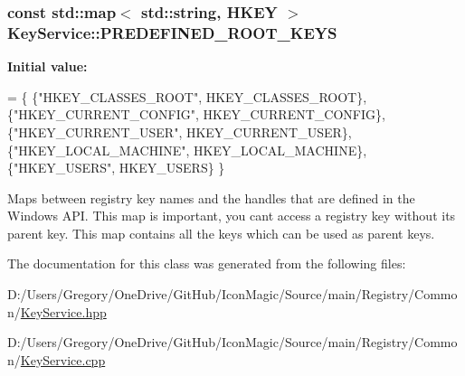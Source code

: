 \subsubsection[{P\+R\+E\+D\+E\+F\+I\+N\+E\+D\+\_\+\+R\+O\+O\+T\+\_\+\+K\+E\+Y\+S}]{\setlength{\rightskip}{0pt plus 5cm}const std\+::map$<$ std\+::string, H\+K\+E\+Y $>$ Key\+Service\+::\+P\+R\+E\+D\+E\+F\+I\+N\+E\+D\+\_\+\+R\+O\+O\+T\+\_\+\+K\+E\+Y\+S\hspace{0.3cm}{\ttfamily [static]}}\label{class_key_service_a105020a568634a91740816aff99ad318}
{\bfseries Initial value\+:}
\begin{DoxyCode}
= \{
  \{\textcolor{stringliteral}{"HKEY\_CLASSES\_ROOT"}, HKEY\_CLASSES\_ROOT\},
  \{\textcolor{stringliteral}{"HKEY\_CURRENT\_CONFIG"}, HKEY\_CURRENT\_CONFIG\},
  \{\textcolor{stringliteral}{"HKEY\_CURRENT\_USER"}, HKEY\_CURRENT\_USER\},
  \{\textcolor{stringliteral}{"HKEY\_LOCAL\_MACHINE"}, HKEY\_LOCAL\_MACHINE\},
  \{\textcolor{stringliteral}{"HKEY\_USERS"}, HKEY\_USERS\}
\}
\end{DoxyCode}
Maps between registry key names and the handles that are defined in the Windows A\+P\+I. This map is important, you can\textquotesingle{}t access a registry key without its parent key. This map contains all the keys which can be used as parent keys. 

The documentation for this class was generated from the following files\+:\begin{DoxyCompactItemize}
\item 
D\+:/\+Users/\+Gregory/\+One\+Drive/\+Git\+Hub/\+Icon\+Magic/\+Source/main/\+Registry/\+Common/\hyperlink{_key_service_8hpp}{Key\+Service.\+hpp}\item 
D\+:/\+Users/\+Gregory/\+One\+Drive/\+Git\+Hub/\+Icon\+Magic/\+Source/main/\+Registry/\+Common/\hyperlink{_key_service_8cpp}{Key\+Service.\+cpp}\end{DoxyCompactItemize}
